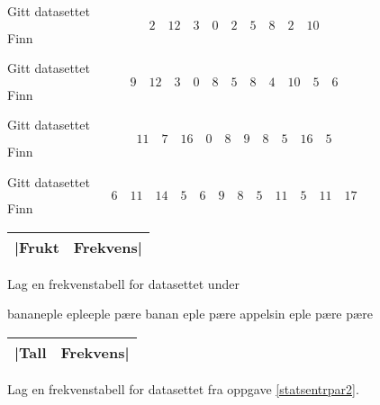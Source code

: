 



\opgt

Gitt datasettet
\[ 2\quad12\quad 3\quad 0\quad 2\quad 5\quad 8\quad2\quad 10 \]
Finn \os
{}

Gitt datasettet
	\[ 9\quad12\quad 3\quad 0\quad 8\quad 5\quad 8\quad4\quad 10\quad 5 \quad 6 \]
Finn \os
{}

Gitt datasettet
\[ 11\quad7\quad 16\quad 0\quad 8\quad 9\quad 8\quad5\quad 16\quad 5 \]
Finn \os
{}

Gitt datasettet
\[ 6\quad11\quad 14\quad 5\quad 6\quad 9\quad 8\quad5\quad 11\quad 5\quad 11\quad 17 \]
Finn \os
{}

 \vs
\begin{center}
	\begin{tabular}{c|c}
		|Frukt & Frekvens| \\ \hline
	\end{tabular}
\end{center}
Lag en frekvenstabell for datasettet under
\begin{center}
	banan\quad eple \quad eple\quad eple \quad pære \quad banan \quad eple \quad pære \quad appelsin \quad eple \quad pære \quad pære
\end{center}

 \vs
\begin{center}
	\begin{tabular}{c|c}
		|Tall & Frekvens| \\ \hline
	\end{tabular}
\end{center}
Lag en frekvenstabell for datasettet fra oppgave \ref{statsentrpar2}.

 \vs
{}

